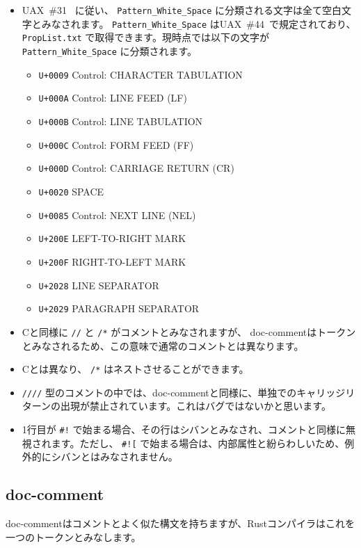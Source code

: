 \documentclass[dvipdfmx,uplatex,papersize,a4paper,10pt]{jsbook}
\theoremstyle{definition}
\begin{document}
\begin{itemize}
  \item UAX~\#31~\cite{UAX31-25} に従い、 \verb|Pattern_White_Space| に分類される文字は全て空白文字とみなされます。 \verb|Pattern_White_Space| はUAX~\#44~\cite{UAX44-18}で規定されており、 \verb|PropList.txt| で取得できます。現時点では以下の文字が \verb|Pattern_White_Space| に分類されます。
    \begin{itemize}
      \item \verb|U+0009| Control: CHARACTER TABULATION
      \item \verb|U+000A| Control: LINE FEED (LF)
      \item \verb|U+000B| Control: LINE TABULATION
      \item \verb|U+000C| Control: FORM FEED (FF)
      \item \verb|U+000D| Control: CARRIAGE RETURN (CR)
      \item \verb|U+0020| SPACE
      \item \verb|U+0085| Control: NEXT LINE (NEL)
      \item \verb|U+200E| LEFT-TO-RIGHT MARK
      \item \verb|U+200F| RIGHT-TO-LEFT MARK
      \item \verb|U+2028| LINE SEPARATOR
      \item \verb|U+2029| PARAGRAPH SEPARATOR
    \end{itemize}
  \item Cと同様に \verb|//| と \verb|/*| がコメントとみなされますが、 doc-commentはトークンとみなされるため、この意味で通常のコメントとは異なります。
  \item Cとは異なり、 \verb|/*| はネストさせることができます。
  \item \verb|////| 型のコメントの中では、doc-commentと同様に、単独でのキャリッジリターンの出現が禁止されています。これはバグではないかと思います。
  \item 1行目が \verb|#!| で始まる場合、その行はシバンとみなされ、コメントと同様に無視されます。ただし、 \verb|#![| で始まる場合は、内部属性と紛らわしいため、例外的にシバンとはみなされません。
\end{itemize}

\subsection{doc-comment}

doc-commentはコメントとよく似た構文を持ちますが、Rustコンパイラはこれを一つのトークンとみなします。
\end{document}

